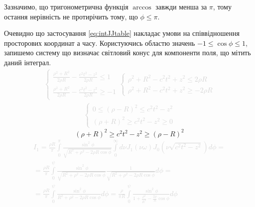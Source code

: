 Зазначимо, що тригонометрична функція $ \arccos $ завжди менша за $ \pi $,
тому остання нерівність не протирічить тому, що $ \phi \leq \pi $.

Очевидно що застосування \eqref{eq:intJJtable} накладає умови на співвідношення
просторових координат а часу. Користуючись областю значень 
$ -1 \leq \cos \phi \leq 1 $, запишемо систему що визначає світловий конус 
\cite[ст. 22]{LandauII} для компоненти поля, що мітить даний інтеграл. 
%
\textcolor{lightgray}{ \begin{equation*} \begin{aligned}
\begin{cases}
\frac{\rho^2 + R^2}{2 \rho R} - \frac{c^2 t^2 - z^2}{2 \rho R} \leq 1 \\
\frac{\rho^2 + R^2}{2 \rho R} - \frac{c^2 t^2 - z^2}{2 \rho R} \geq - 1
\end{cases}
\begin{cases}
\rho^2 + R^2 - c^2 t^2 + z^2 \leq 2 \rho R \\
\rho^2 + R^2 - c^2 t^2 + z^2 \geq - 2 \rho R
\end{cases} 
\end{aligned} \end{equation*} }
%
\textcolor{lightgray}{ \begin{equation*} \begin{aligned}
\begin{cases}
0 \leq \left( \rho - R \right)^2 \leq c^2 t^2 - z^2 \\ 
\left( \rho + R \right)^2 \geq c^2 t^2 - z^2 \geq 0
\end{cases} 
\end{aligned} \end{equation*} }
%
\begin{equation*}
\left( \rho + R \right)^2 \geq c^2 t^2 - z^2 \geq \left( \rho - R \right)^2
\end{equation*}
%
\textcolor{lightgray}{ \begin{equation*} \begin{aligned}
I_1 = \frac{\rho R}{\pi} \int\limits_{0}^{\pi} 
\frac{\sin^2{\phi}}{\sqrt{R^2 + \rho^2 - 2 \rho R \cos \phi}}
\int\limits_{0}^{\infty} d \nu J_1 \left( \nu \omega \right) 
J_0 \left( \nu \sqrt{c^2 t^2 - z^2} \right) d \phi = \\
= \frac{\rho R}{\pi} \int\limits_{0}^{\psi} 
\frac{\sin^2{\phi}}{\sqrt{R^2 + \rho^2 - 2 \rho R \cos \phi}}
\frac{1}{\sqrt{R^2 + \rho^2 - 2 \rho R \cos \phi}} d \phi = \\
= \frac{\rho R}{\pi} \int\limits_{0}^{\psi}
\frac{\sin^2{\phi}}{R^2 + \rho^2 - 2 \rho R \cos \phi} d \phi = 
\frac{\rho}{\pi R} \int\limits_{0}^{\psi}
\frac{\sin^2{\phi}}{1 + \frac{\rho^2}{R^2} - \frac{2 \rho}{R} \cos \phi} d \phi
\end{aligned} \end{equation*} }

